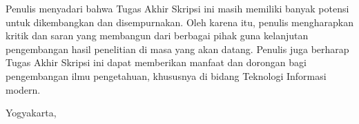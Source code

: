 Penulis menyadari bahwa Tugas Akhir Skripsi ini masih memiliki banyak potensi untuk dikembangkan dan disempurnakan. Oleh karena itu, penulis mengharapkan kritik dan saran yang membangun dari berbagai pihak guna kelanjutan pengembangan hasil penelitian di masa yang akan datang. Penulis juga berharap Tugas Akhir Skripsi ini dapat memberikan manfaat dan dorongan bagi pengembangan ilmu pengetahuan, khususnya di bidang Teknologi Informasi modern.

\begin{flushright}
    Yogyakarta, \tglpengesahan\\[1.25cm]
    \penulis \\
    \nim
\end{flushright}
